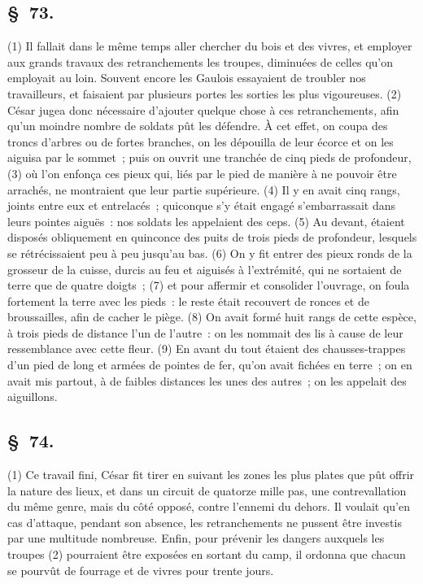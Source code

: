 \documentclass[french,twoside]{book} %
\begin{document}
\subsection[{§ 73.}]{ \textsc{§ 73.} }
\noindent (1) Il fallait dans le même temps aller chercher du bois et des vivres, et employer aux grands travaux des retranchements les troupes, diminuées de celles qu’on employait au loin. Souvent encore les Gaulois essayaient de troubler nos travailleurs, et faisaient par plusieurs portes les sorties les plus vigoureuses. (2) César jugea donc nécessaire d’ajouter quelque chose à ces retranchements, afin qu’un moindre nombre de soldats pût les défendre. À cet effet, on coupa des troncs d’arbres ou de fortes branches, on les dépouilla de leur écorce et on les aiguisa par le sommet ; puis on ouvrit une tranchée de cinq pieds de profondeur, (3) où l’on enfonça ces pieux qui, liés par le pied de manière à ne pouvoir être arrachés, ne montraient que leur partie supérieure. (4) Il y en avait cinq rangs, joints entre eux et entrelacés ; quiconque s’y était engagé s’embarrassait dans leurs pointes aiguës : nos soldats les appelaient des ceps. (5) Au devant, étaient disposés obliquement en quinconce des puits de trois pieds de profondeur, lesquels se rétrécissaient peu à peu jusqu’au bas. (6) On y fit entrer des pieux ronds de la grosseur de la cuisse, durcis au feu et aiguisés à l’extrémité, qui ne sortaient de terre que de quatre doigts ; (7) et pour affermir et consolider l’ouvrage, on foula fortement la terre avec les pieds : le reste était recouvert de ronces et de broussailles, afin de cacher le piège. (8) On avait formé huit rangs de cette espèce, à trois pieds de distance l’un de l’autre : on les nommait des lis à cause de leur ressemblance avec cette fleur. (9) En avant du tout étaient des chausses-trappes d’un pied de long et armées de pointes de fer, qu’on avait fichées en terre ; on en avait mis partout, à de faibles distances les unes des autres ; on les appelait des aiguillons.
\subsection[{§ 74.}]{ \textsc{§ 74.} }
\noindent (1) Ce travail fini, César fit tirer en suivant les zones les plus plates que pût offrir la nature des lieux, et dans un circuit de quatorze mille pas, une contrevallation du même genre, mais du côté opposé, contre l’ennemi du dehors. Il voulait qu’en cas d’attaque, pendant son absence, les retranchements ne pussent être investis par une multitude nombreuse. Enfin, pour prévenir les dangers auxquels les troupes (2) pourraient être exposées en sortant du camp, il ordonna que chacun se pourvût de fourrage et de vivres pour trente jours.
\end{document}
